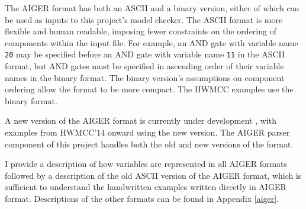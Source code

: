 \documentclass[12pt,a4paper,twoside,openright]{report}
\begin{document}
The AIGER format has both an ASCII and a binary version, either of which
can be used as inputs to this project's model checker. The ASCII
format is more flexible and human readable, imposing fewer constraints
on the ordering of components within the input file. For example, an
AND gate with variable name {\tt 20} may be specified before an AND gate with
variable name {\tt 11} in the ASCII format, but AND gates must be specified in
ascending order of their variable names in the binary format.
The binary version's assumptions on component ordering allow the format
to be more compact. The HWMCC examples use the binary format.

A new version of the AIGER format is currently under development \cite{aiger}, with
examples from HWMCC'14 onward using the new version. The AIGER parser component
of this project handles both the old and new versions of the format.

I provide a description of how variables are represented in all AIGER formats
followed by a description of the old ASCII version of the AIGER format, which
is sufficient to understand the handwritten examples written directly
in AIGER format. Descriptions of the other formats can be found in Appendix
\ref{aiger}.
\end{document}
